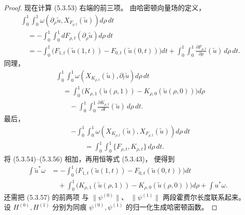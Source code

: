 \begin{proof}
现在计算 (5.3.53)
右端的前三项。
由哈密顿向量场的定义，
\begin{equation}
\begin{aligned}
&\int_0^1\!\!\int_0^1
\omega\!\left(
\partial_\rho\widetilde u,
X_{F_{\rho,t}}(\widetilde u)
\right)d\rho\,dt
\\
&\quad=
-\int_0^1\!\!\int_0^1
dF_{\rho,t}
\left(\partial_\rho\widetilde u\right)
d\rho\,dt
\\
&\quad=
-\int_0^1
\bigl(
F_{1,t}(\widetilde u(1,t))
-F_{0,t}(\widetilde u(0,t))
\bigr)dt
+\int_0^1\!\!\int_0^1
\frac{\partial F_{\rho,t}}{\partial\rho}
(\widetilde u)\,d\rho\,dt.
\end{aligned}
\tag{5.3.54}\label{eq:5-3-54}
\end{equation}
同理，
\begin{equation}
\begin{aligned}
&\int_0^1\!\!\int_0^1
\omega\!\left(
X_{K_{\rho,t}}(\widetilde u),
\partial_t\widetilde u
\right)d\rho\,dt
\\
&\quad=
\int_0^1
\bigl(
K_{\rho,1}(\widetilde u(\rho,1))
-K_{\rho,0}(\widetilde u(\rho,0))
\bigr)d\rho
\\
&\qquad-
\int_0^1\!\!\int_0^1
\frac{\partial K_{\rho,t}}{\partial t}
(\widetilde u)\,d\rho\,dt.
\end{aligned}
\tag{5.3.55}\label{eq:5-3-55}
\end{equation}
最后，
\begin{equation}
\begin{aligned}
&-\int_0^1\!\!\int_0^1
\omega\!\left(
X_{K_{\rho,t}}(\widetilde u),
X_{F_{\rho,t}}(\widetilde u)
\right)d\rho\,dt
\\
&\qquad=
\int_0^1\!\!\int_0^1
\{F_{\rho,t},K_{\rho,t}\}
\,d\rho\,dt.
\end{aligned}
\tag{5.3.56}\label{eq:5-3-56}
\end{equation}
将 (5.3.54)--(5.3.56)
相加，再用恒等式 (5.3.43)，
便得到
\begin{equation}
\begin{aligned}
\int\widetilde u^*\omega
&=
-\int_0^1
\bigl(
F_{1,t}(\widetilde u(1,t))
-F_{0,t}(\widetilde u(0,t))
\bigr)dt
\\
&\quad+
\int_0^1
\bigl(
K_{\rho,1}(\widetilde u(\rho,1))
-K_{\rho,0}(\widetilde u(\rho,0))
\bigr)d\rho
+\int u^*\omega.
\end{aligned}
\tag{5.3.57}\label{eq:5-3-57}
\end{equation}
还需把 (5.3.57) 的前两项
与 $\|\psi^{(0)}\|$、
$\|\psi^{(1)}\|$
两段霍费尔长度联系起来。
设 $H^{(0)},H^{(1)}$
分别为同痕
$\psi^{(0)},\psi^{(1)}$
的归一化生成哈密顿函数。


\end{proof}
